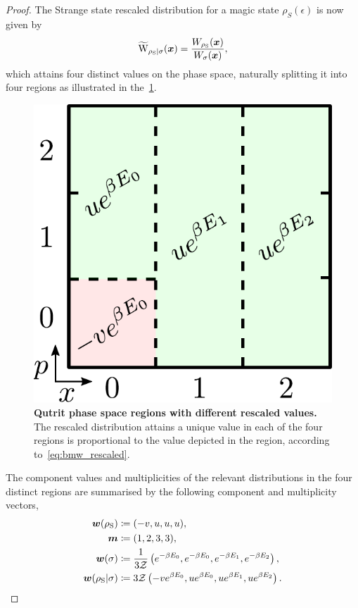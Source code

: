 \documentclass[pra,
aps,
twocolumn,
superscriptaddress,
groupedaddress,
nofootinbib,
reprint
]{revtex4-1}
\begin{document}
\begin{proof}
The Strange state rescaled distribution for a magic state $\rho_S(\epsilon)$ is now given by 
\begin{equation}
	\widetilde{\rm{W}}_{\rho_{\rm{S}}|\sigma}(\bmx) = \frac{\W[\bmx]{\rho_{\rm{S}}}}{\W[\bmx]{\sigma}},
\end{equation}
which attains four distinct values on the phase space, naturally splitting it into four regions as illustrated in the~\cref{fig:pd_split_thermal}.
\begin{figure}[h]
    \centering
    \includegraphics[scale=0.45]{figs/pd_split_thermal.pdf}
    \caption{\textbf{Qutrit phase space regions with different rescaled values.}
    The rescaled distribution attains a unique value in each of the four regions is proportional to the value depicted in the region, according to~\cref{eq:bmw_rescaled}.
    }
    \label{fig:pd_split_thermal}
\end{figure}

The component values and multiplicities of the relevant distributions in the four distinct regions are summarised by the following component and multiplicity vectors,
\begin{align}
	\bm{w}(\rho_{\rm{S}}) &\coloneqq (-v, u, u, u), \\
		\bm{m} &\coloneqq (1,2,3,3), \\
	\bm{w}(\sigma) &\coloneqq \frac{1}{3\mathcal{Z}} \left( e^{-\beta E_0}, e^{-\beta E_0}, e^{-\beta E_1}, e^{-\beta E_2} \right), \\
	\bm{w}(\rho_{\rm{S}} | \sigma) &\coloneqq 3\mathcal{Z} \left( -v e^{\beta E_0}, u e^{\beta E_0}, u e^{\beta E_1}, u e^{\beta E_2} \right). \label{eq:bmw_rescaled}
\end{align}


\end{proof}
\end{document}
